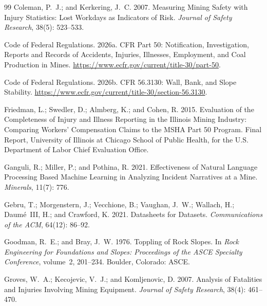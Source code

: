 \documentclass[letterpaper,twocolumn,10pt]{article}
\begin{document}
\begin{thebibliography}{99}
Coleman, P.~J.; and Kerkering, J.~C. 2007.
\newblock Measuring Mining Safety with Injury Statistics: Lost Workdays as Indicators of Risk.
\newblock \emph{Journal of Safety Research}, 38(5): 523--533.

Code of Federal Regulations. 2026a.
 CFR Part 50: Notification, Investigation, Reports and Records of Accidents, Injuries, Illnesses, Employment, and Coal Production in Mines.
\newblock \url{https://www.ecfr.gov/current/title-30/part-50}.

Code of Federal Regulations. 2026b.
 CFR 56.3130: Wall, Bank, and Slope Stability.
\newblock \url{https://www.ecfr.gov/current/title-30/section-56.3130}.

Friedman, L.; Swedler, D.; Almberg, K.; and Cohen, R. 2015.
\newblock Evaluation of the Completeness of Injury and Illness Reporting in the Illinois Mining Industry: Comparing Workers' Compensation Claims to the MSHA Part 50 Program.
\newblock Final Report, University of Illinois at Chicago School of Public Health, for the U.S. Department of Labor Chief Evaluation Office.

Ganguli, R.; Miller, P.; and Pothina, R. 2021.
\newblock Effectiveness of Natural Language Processing Based Machine Learning in Analyzing Incident Narratives at a Mine.
\newblock \emph{Minerals}, 11(7): 776.

Gebru, T.; Morgenstern, J.; Vecchione, B.; Vaughan, J.~W.; Wallach, H.; Daum\'e~III, H.; and Crawford, K. 2021.
\newblock Datasheets for Datasets.
\newblock \emph{Communications of the ACM}, 64(12): 86--92.

Goodman, R.~E.; and Bray, J.~W. 1976.
\newblock Toppling of Rock Slopes.
\newblock In \emph{Rock Engineering for Foundations and Slopes: Proceedings of the ASCE Specialty Conference}, volume~2, 201--234. Boulder, Colorado: ASCE.

Groves, W.~A.; Kecojevic, V.~J.; and Komljenovic, D. 2007.
\newblock Analysis of Fatalities and Injuries Involving Mining Equipment.
\newblock \emph{Journal of Safety Research}, 38(4): 461--470.


\end{thebibliography}
\end{document}

